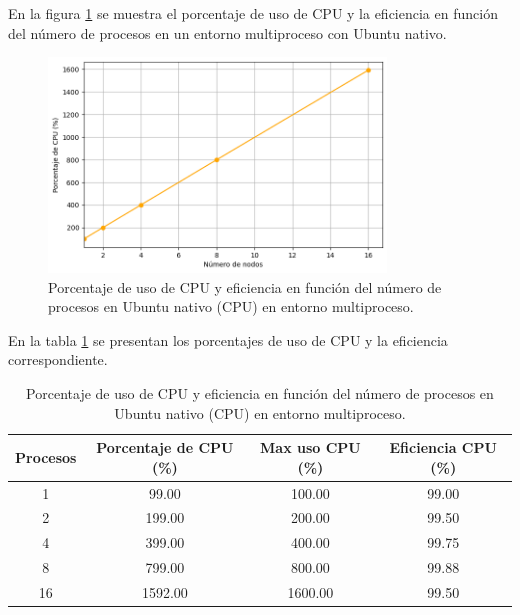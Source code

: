 En la figura \ref{fig:multi-node_ubuntu_cpu_native_cpu} se muestra el porcentaje de uso de CPU y la eficiencia en función del número de procesos en un entorno multiproceso con Ubuntu nativo.

\begin{figure}[ht]
    \centering
    \includegraphics[width=0.8\textwidth]{imagenes/cap5/multi-node_ubuntu_cpu_native_cpu_time.png}
    \caption{Porcentaje de uso de CPU y eficiencia en función del número de procesos en Ubuntu nativo (CPU) en entorno multiproceso.}
    \label{fig:multi-node_ubuntu_cpu_native_cpu}
\end{figure}

En la tabla \ref{tab:multi-node_ubuntu_cpu_native_cpu} se presentan los porcentajes de uso de CPU y la eficiencia correspondiente.

\begin{table}[ht]
    \centering
    \small
    \setlength{\tabcolsep}{4pt}
    \renewcommand{\arraystretch}{1.1}
    \begin{tabular}{|c|c|c|c|}
        \hline
        \textbf{Procesos} & \textbf{Porcentaje de CPU (\%)} & \textbf{Max uso CPU (\%)} & \textbf{Eficiencia CPU (\%)} \\
        \hline
        1                 & 99.00                           & 100.00                    & 99.00                        \\
        2                 & 199.00                          & 200.00                    & 99.50                        \\
        4                 & 399.00                          & 400.00                    & 99.75                        \\
        8                 & 799.00                          & 800.00                    & 99.88                        \\
        16                & 1592.00                         & 1600.00                   & 99.50                        \\
        \hline
    \end{tabular}
    \caption{Porcentaje de uso de CPU y eficiencia en función del número de procesos en Ubuntu nativo (CPU) en entorno multiproceso.}
    \label{tab:multi-node_ubuntu_cpu_native_cpu}
\end{table}

